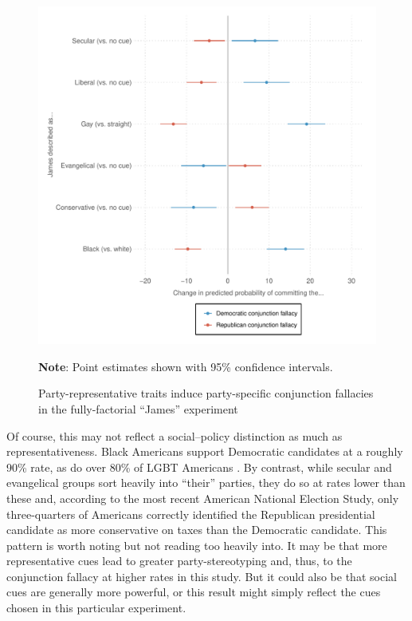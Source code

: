 \documentclass[12pt, letterpaper]{article}
\begin{document}
\begin{figure}
\caption{Party-representative traits induce party-specific conjunction fallacies in the fully-factorial ``James'' experiment}
\label{fig:james_ff}
\begin{center}
\includegraphics[width=1\textwidth]{../figs/james_ff.pdf}
\end{center}
\scriptsize{\textbf{Note}: Point estimates shown with 95\% confidence intervals.}
\end{figure}

Of course, this may not reflect a social--policy distinction as much as representativeness. Black Americans support Democratic candidates at a roughly 90\% rate, as do over 80\% of LGBT Americans \citep{fitzsimmons2018record}. By contrast, while secular and evangelical groups sort heavily into ``their'' parties, they do so at rates lower than these \citep{pew_religion} and, according to the most recent American National Election Study\nocite{ANES}, only three-quarters of Americans correctly identified the Republican presidential candidate as more conservative on taxes than the Democratic candidate. This pattern is worth noting but not reading too heavily into. It may be that more representative cues lead to greater party-stereotyping and, thus, to the conjunction fallacy at higher rates in this study. But it could also be that social cues are generally more powerful, or this result might simply reflect the cues chosen in this particular experiment. 
\end{document}
